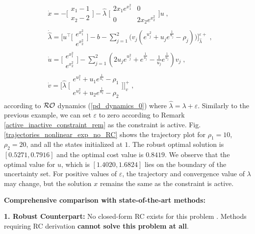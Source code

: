 \documentclass[journal,twoside,web]{ieeecolor}
\newcommand{\rev}[1]{\textcolor{revisionblue}{#1}}
\begin{document}
\begin{align*}
&\dot x=-\Big[\begin{array}{ccl} x_1-1 \\ x_2-2 \end{array}\Big]-\hat{\lambda}\; \Big[\begin{array}{cc} 2 x_1 e^{x_1^2} & 0 \\ 0 & 2 x_2 e^{x_2^2}\end{array}\Big]u \nonumber\;,\\
&\dot {\hat{\lambda}} = \Big[u^\top \Big[\begin{array}{cc} e^{x_1^2}\\ e^{x_2^2}\end{array}\Big]-b- \sum_{j=1}^2 \big(v_j(e^{u_j^2}+u_j e^{\frac{1}{u_j}}-\rho_j)\big)\Big]_{\hat{\lambda}}^{\varepsilon+}\nonumber\;,\\
&\dot u=\Big[\begin{array}{cc} e^{x_1^2}\\ e^{x_2^2}\end{array}\Big]- \sum_{j=1}^2(2u_j e^{u_j^2}+e^{\frac{1}{u_j}}-\frac{1}{u_j} e^{\frac{1}{u_j}}) v_j\nonumber\;,\\
&\dot v=\Big[\hat{\lambda}\; \Big[\begin{array}{cc} e^{u_1^2}+u_1 e^{\frac{1}{u_1}}-\rho_1 \\ e^{u_2^2}+u_2 e^{\frac{1}{u_2}}-\rho_2 \end{array}\Big] \Big]_{v}^+\nonumber\;,
\end{align*}
according to ${\cal RO}$ dynamics (\ref{pd_dynamics_0}) where $\hat{\lambda}=\lambda+\varepsilon$. Similarly to the previous example, we can set $\varepsilon$ to zero according to Remark \ref{active_inactive_constraint_rem} as the constraint is active. Fig. \ref{trajectories_nonlinear_exp_no_RC} shows the trajectory plot for $\rho_1=10$, $\rho_2=20$, and all the states initialized at $1$. The robust optimal solution is $[0.5271, 0.7916]$ and the optimal cost value is $0.8419$. We observe that the optimal value for $u$, which is $[1.4020, 1.6824]$ lies on the boundary of the uncertainty set. For positive values of $\varepsilon$, the trajectory and convergence value of $\lambda$ may change, but the solution $x$ remains the same as the constraint is active.

\rev{\textbf{Comprehensive comparison with state-of-the-art methods:}}

\rev{\textbf{1. Robust Counterpart:} No closed-form RC exists for this problem \cite{bental2009,gorissen20152}. Methods requiring RC derivation \textbf{cannot solve this problem at all}.}
\end{document}

